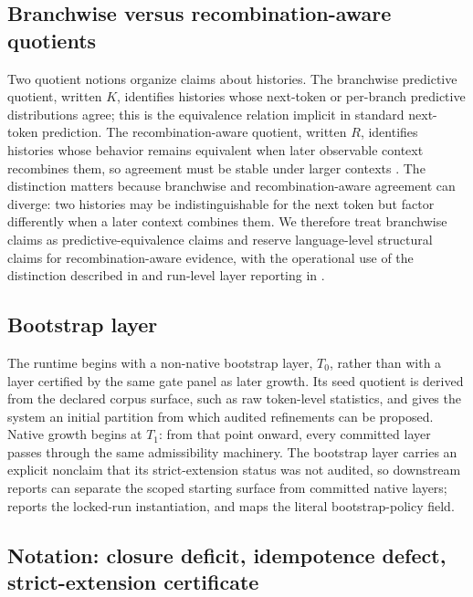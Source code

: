 \documentclass{article}
\newcommand{\Tlayer}[1]{T_{#1}}                    \newcommand{\Xspace}[1]{X_{#1}}                    \newcommand{\opmap}[1]{\mathrm{op}_{#1}}           \newcommand{\CDtau}{\mathrm{CD}_{\tau}}            \newcommand{\IDef}{\delta_{\tau,f}}                \newcommand{\strictcert}{\mathsf{StrictExtCert}}   \newcommand{\Kquot}{K}                             \newcommand{\Rquot}{R}
\theoremstyle{definition}
\begin{document}
\subsection{Branchwise versus recombination-aware quotients}\label{subsec:k-vs-r}

Two quotient notions organize claims about histories. The branchwise predictive quotient, written $\Kquot$, identifies histories whose next-token or per-branch predictive distributions agree; this is the equivalence relation implicit in standard next-token prediction. The recombination-aware quotient, written $\Rquot$, identifies histories whose behavior remains equivalent when later observable context recombines them, so agreement must be stable under larger contexts \cite{Tsiokos2026RecombinationWitnesses}. The distinction matters because branchwise and recombination-aware agreement can diverge: two histories may be indistinguishable for the next token but factor differently when a later context combines them. We therefore treat branchwise claims as predictive-equivalence claims and reserve language-level structural claims for recombination-aware evidence, with the operational use of the distinction described in  and run-level layer reporting in .

\subsection{Bootstrap layer}\label{subsec:bootstrap-layer}

The runtime begins with a non-native bootstrap layer, $\Tlayer{0}$, rather than with a layer certified by the same gate panel as later growth. Its seed quotient is derived from the declared corpus surface, such as raw token-level statistics, and gives the system an initial partition from which audited refinements can be proposed. Native growth begins at $\Tlayer{1}$: from that point onward, every committed layer passes through the same admissibility machinery. The bootstrap layer carries an explicit nonclaim that its strict-extension status was not audited, so downstream reports can separate the scoped starting surface from committed native layers;  reports the locked-run instantiation, and  maps the literal bootstrap-policy field.

\subsection{Notation: closure deficit, idempotence defect, strict-extension certificate}\label{subsec:notation}
\end{document}
